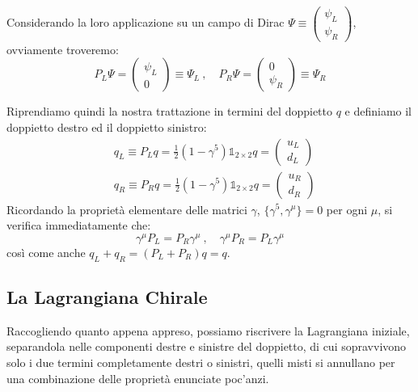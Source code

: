 \documentclass[../main.tex]{subfiles}
\begin{document}
Considerando la loro applicazione su un campo di Dirac $\Psi\equiv\begin{pmatrix}\psi_L\\\psi_R\end{pmatrix}$, ovviamente troveremo:
\[
P_L\Psi = \begin{pmatrix}\psi_L\\0\end{pmatrix} \equiv \Psi_L~,\quad 
P_R\Psi = \begin{pmatrix}0\\\psi_R\end{pmatrix} \equiv \Psi_R
\]

Riprendiamo quindi la nostra trattazione in termini del doppietto $q$ e definiamo il doppietto destro ed il doppietto sinistro:
\begin{equation}
    \begin{aligned}
        &q_L\equiv P_Lq = \frac{1}{2}(1-\gamma^5)\mathbb 1_{2\times2}q = \begin{pmatrix}u_L\\d_L\end{pmatrix} \\
        &q_R\equiv P_Rq = \frac{1}{2}(1-\gamma^5)\mathbb 1_{2\times2}q = \begin{pmatrix}u_R\\d_R\end{pmatrix} 
    \end{aligned}
    \label{eq:leftright_doublet}
\end{equation}
Ricordando la proprietà elementare delle matrici $\gamma$, $\big\{\gamma^5, \gamma^\mu\big\}=0$ per ogni $\mu$, si verifica immediatamente che:
\begin{equation}
    \boxed{\gamma^\mu P_L = P_R\gamma^\mu ~,\quad \gamma^\mu P_R = P_L\gamma^\mu }
\label{eq:gamma_projectors_fliprule}
\end{equation}
così come anche $q_L+q_R = (P_L+P_R)q = q$.

\subsection{La Lagrangiana Chirale}

Raccogliendo quanto appena appreso, possiamo riscrivere la Lagrangiana iniziale, separandola nelle componenti destre e sinistre del doppietto, di cui sopravvivono solo i due termini completamente destri o sinistri, quelli misti si annullano per una combinazione delle proprietà enunciate poc'anzi.
\end{document}
